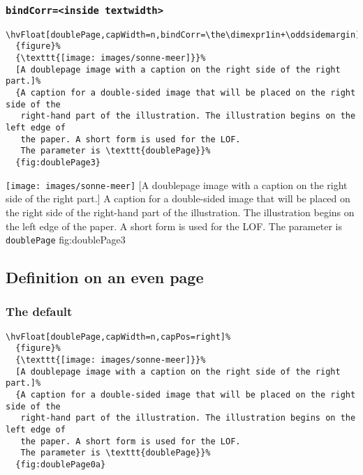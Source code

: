 \documentclass[twoside]{scrartcl}
\makeatletter
\let\hvBlindtext\Blindtext
\def\Blindtext{\par\color{black!40}\hvBlindtext\par\normalcolor}
\def\hvblindtext{\textcolor{black!40}{\blindtext@text}}
\makeatother
\begin{document}
\Blindtext

\Blindtext

\Blindtext

\hvblindtext

\subsubsection{\texttt{bindCorr=<inside textwidth>}}

\begin{lstlisting}
\hvFloat[doublePage,capWidth=n,bindCorr=\the\dimexpr1in+\oddsidemargin]%
  {figure}%
  {\texttt{[image: images/sonne-meer]}}%
  [A doublepage image with a caption on the right side of the right part.]%
  {A caption for a double-sided image that will be placed on the right side of the
   right-hand part of the illustration. The illustration begins on the left edge of 
   the paper. A short form is used for the LOF. 
   The parameter is \texttt{doublePage}}%
  {fig:doublePage3}
\end{lstlisting}

%
  {\texttt{[image: images/sonne-meer]}}%
  [A doublepage image with a caption on the right side of the right part.]%
  {A caption for a double-sided image that will be placed on the right side of the
   right-hand part of the illustration. The illustration begins on the left edge of 
   the paper. A short form is used for the LOF. 
   The parameter is \texttt{doublePage}}%
  {fig:doublePage3}


\Blindtext

\hvblindtext

\hvblindtext
\hvblindtext

\hvblindtext
\subsection{Definition on an even page}

\subsubsection{The default}
\begin{verbatim}
\hvFloat[doublePage,capWidth=n,capPos=right]%
  {figure}%
  {\texttt{[image: images/sonne-meer]}}%
  [A doublepage image with a caption on the right side of the right part.]%
  {A caption for a double-sided image that will be placed on the right side of the
   right-hand part of the illustration. The illustration begins on the left edge of 
   the paper. A short form is used for the LOF. 
   The parameter is \texttt{doublePage}}%
  {fig:doublePage0a}
\end{verbatim}
\end{document}

